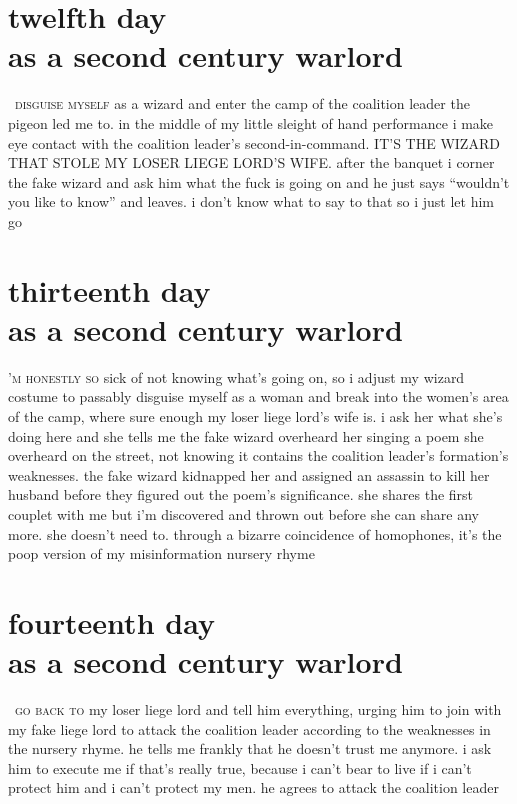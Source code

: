 \documentclass[smalldemyvopaper,11pt,twoside,onecolumn,openany,extrafontsizes]{memoir}
\newlength\drop
\begin{document}
\chapter{twelfth day\\as a second century warlord}

\lettrine[lhang=0.2,lines=3,findent=2pt]{}{\, disguise myself}
as a wizard and enter the camp of the coalition leader the pigeon led me to.
in the middle of my little sleight of hand performance i make eye contact with
the coalition leader's second-in-command. IT'S THE WIZARD THAT STOLE MY LOSER
LIEGE LORD'S WIFE. after the banquet i corner the fake wizard and ask him what
the fuck is going on and he just says ``wouldn't you like to know'' and leaves.
i don't know what to say to that so i just let him go

\chapter{thirteenth day\\as a second century warlord}
\lettrine[lhang=0.2,lines=3,findent=0pt]{}{'m honestly so} sick of
not knowing what's going on, so i adjust my wizard costume to passably disguise
myself as a woman and break into the women's area of the camp, where sure
enough my loser liege lord's wife is. i ask her what she's doing here and she
tells me the fake wizard overheard her singing a poem she overheard on the
street, not knowing it contains the coalition leader's formation's weaknesses.
the fake wizard kidnapped her and assigned an assassin to kill her husband
before they figured out the poem's significance. she shares the first couplet
with me but i'm discovered and thrown out before she can share any more.
she doesn't need to. through a bizarre coincidence of homophones, it's the
poop version of my misinformation nursery rhyme

\chapter{fourteenth day\\as a second century warlord}
\lettrine[lhang=0.2,lines=3,findent=2pt]{}{\, go back to}
my loser liege lord and tell him everything, urging him to join with my fake
liege lord to attack the coalition leader according to the weaknesses in the
nursery rhyme. he tells me frankly that he doesn't trust me anymore. i ask him
to execute me if that's really true, because i can't bear to live if i can't
protect him and i can't protect my men. he agrees to attack the coalition leader
\end{document}
